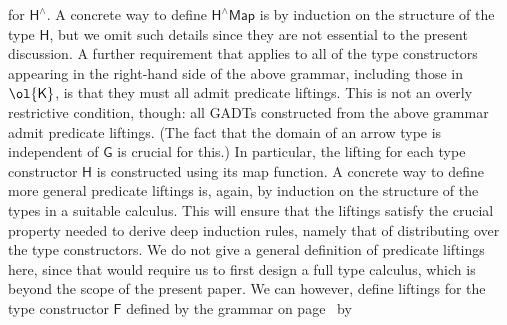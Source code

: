 \documentclass[sigplan,10pt]{acmart}
\begin{document}
for $\mathsf{H^{\wedge}}$. A concrete way to define $\mathsf{H^\wedge
  Map}$ is by induction on the structure of the type $\mathsf{H}$, but
we omit such details since they are not essential to the present
discussion. A further requirement that applies to all of the type
constructors appearing in the right-hand side of the above grammar,
including those in $\ol{\mathsf{K}}$, is that they must all admit
predicate liftings. This is not an overly restrictive condition,
though: all
GADTs constructed from the above grammar admit predicate liftings.
(The fact that the domain of an arrow type is independent of
$\mathsf{G}$ is crucial for this.) In particular, the lifting for each
type constructor $\mathsf{H}$ is constructed using its map function.
A concrete way to define more general predicate liftings is, again, by
induction on the structure of the types in a suitable calculus. This
will ensure that the liftings satisfy the crucial property needed to
derive deep induction rules, namely that of distributing over the type
constructors. We do not give a general definition of predicate
liftings here, since that would require us to first design a full type
calculus, which is beyond the scope of the present paper. We can
however, define liftings for the type constructor $\mathsf{F}$ defined
by the grammar on page~\pageref{grammar} by
\end{document}
